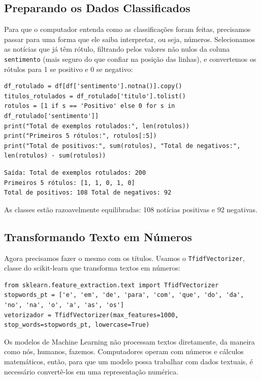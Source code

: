 \documentclass[a4paper,12pt,openany]{book}
\begin{document}
\subsection{Preparando os Dados Classificados}
Para que o computador entenda como as classificações foram feitas, precisamos passar para uma forma que ele saiba interpretar, ou seja, números. Selecionamos as notícias que já têm rótulo, filtrando pelos valores não nulos da coluna \texttt{sentimento} (mais seguro do que confiar na posição das linhas), e convertemos os rótulos para 1 se positivo e 0 se negativo:

\begin{verbatim}
df_rotulado = df[df['sentimento'].notna()].copy()
titulos_rotulados = df_rotulado['titulo'].tolist()
rotulos = [1 if s == 'Positivo' else 0 for s in df_rotulado['sentimento']]
print("Total de exemplos rotulados:", len(rotulos))
print("Primeiros 5 rótulos:", rotulos[:5])
print("Total de positivos:", sum(rotulos), "Total de negativos:", len(rotulos) - sum(rotulos))
\end{verbatim}
\begin{verbatim}
Saída: Total de exemplos rotulados: 200
Primeiros 5 rótulos: [1, 1, 0, 1, 0]
Total de positivos: 108 Total de negativos: 92
\end{verbatim}

As classes estão razoavelmente equilibradas: 108 notícias positivas e 92 negativas.

\subsection{Transformando Texto em Números}
Agora precisamos fazer o mesmo com os títulos. Usamos o \texttt{TfidfVectorizer}, classe do scikit-learn que transforma textos em números:

\begin{verbatim}
from sklearn.feature_extraction.text import TfidfVectorizer
stopwords_pt = ['e', 'em', 'de', 'para', 'com', 'que', 'do', 'da', 'no', 'na', 'o', 'a', 'as', 'os']
vetorizador = TfidfVectorizer(max_features=1000, stop_words=stopwords_pt, lowercase=True)
\end{verbatim}

Os modelos de Machine Learning não processam textos diretamente, da maneira como nós, humanos, fazemos. Computadores operam com números e cálculos matemáticos, então, para que um modelo possa trabalhar com dados textuais, é necessário convertê-los em uma representação numérica.
\end{document}
